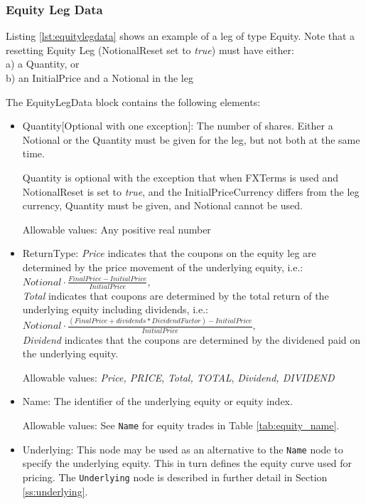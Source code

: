 \subsubsection{Equity Leg Data}
\label{ss:equitylegdata}

Listing \ref{lst:equitylegdata} shows an example of a leg of type Equity. Note that a resetting Equity Leg (NotionalReset set to  \emph{true}) must have either: \\
a) a Quantity, or \\
b) an InitialPrice and a Notional in the leg

The EquityLegData block contains the following elements:

\begin{itemize}
\item Quantity[Optional with one exception]: The number of shares. Either a Notional or the Quantity must be given for the leg, but not both at the same time. 

Quantity is optional with the exception that when FXTerms is used and NotionalReset is set to  \emph{true}, and the InitialPriceCurrency differs from the leg currency, Quantity must be given, and Notional cannot be used.

  Allowable values: Any positive real number

\item ReturnType: \emph{Price} indicates that the coupons on the equity leg are determined by the  price movement of the underlying equity, i.e.: $Notional \cdot \frac{FinalPrice - InitialPrice} {InitialPrice}$, \\ 
 \emph{Total} indicates that coupons are determined by the total return of the underlying equity including dividends, i.e.: \\
 $Notional \cdot \frac{(FinalPrice + dividends * DividendFactor) - InitialPrice} {InitialPrice}$, \\
 \emph{Dividend} indicates that the coupons are determined by the dividened paid on the underlying equity.
 
Allowable values:  \emph{Price, PRICE}, \emph{Total, TOTAL}, \emph{Dividend, DIVIDEND}

\item Name: The identifier of the underlying equity or equity index.

Allowable values: See \lstinline!Name! for equity trades in Table \ref{tab:equity_name}. \\

\item Underlying:  This node may be used as an alternative to the \lstinline!Name! node to specify the underlying equity. This in turn defines the equity curve used for pricing. The \lstinline!Underlying! node is described in further detail in Section \ref{ss:underlying}. \\


\end{itemize}
